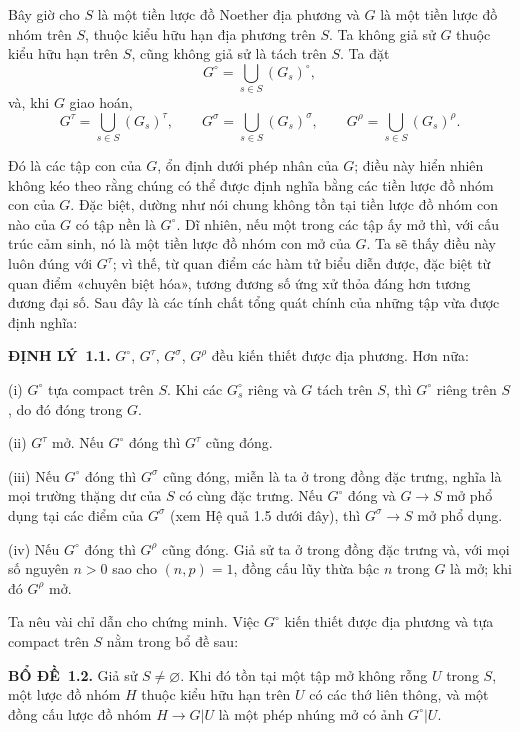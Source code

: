 \documentclass[11pt,twoside,openany]{book}
\numberwithin{equation}{section}
\newcommand{\src}[1]{%
  \phantomsection\hypertarget{src:\fgasourceid:#1}{}%
  \marginpar{\raggedleft\footnotesize\sffamily #1}%
}
\newcommand{\fgasourceid}{unset}
\newcommand{\result}[2]{\par\medskip\noindent\textbf{#1\if\relax\detokenize{#2}\relax\else\ #2\fi.}\quad}
\begin{document}
Bây giờ cho $S$ là một tiền lược đồ Noether địa phương và $G$ là một tiền
lược đồ nhóm trên $S$, thuộc kiểu hữu hạn địa phương trên $S$. Ta không giả
sử $G$ thuộc kiểu hữu hạn trên $S$, cũng không giả sử là tách trên $S$. Ta
đặt
\[
G^\circ=\bigcup_{s\in S}(G_s)^\circ,
\]
và, khi $G$ giao hoán,
\[
G^\tau=\bigcup_{s\in S}(G_s)^\tau,
\qquad
G^\sigma=\bigcup_{s\in S}(G_s)^\sigma,
\qquad
G^\rho=\bigcup_{s\in S}(G_s)^\rho.
\]
\src{224}
Đó là các tập con của $G$, ổn định dưới phép nhân của $G$; điều này hiển nhiên
không kéo theo rằng chúng có thể được định nghĩa bằng các tiền lược đồ nhóm
con của $G$. Đặc biệt, dường như nói chung không tồn tại tiền lược đồ nhóm
con nào của $G$ có tập nền là $G^\circ$. Dĩ nhiên, nếu một trong các tập ấy
mở thì, với cấu trúc cảm sinh, nó là một tiền lược đồ nhóm con mở của $G$. Ta
sẽ thấy điều này luôn đúng với $G^\tau$; vì thế, từ quan điểm các hàm tử biểu
diễn được, đặc biệt từ quan điểm «chuyên biệt hóa», tương đương số ứng xử thỏa
đáng hơn tương đương đại số. Sau đây là các tính chất tổng quát chính của
những tập vừa được định nghĩa:

\result{ĐỊNH LÝ}{1.1} $G^\circ$, $G^\tau$, $G^\sigma$, $G^\rho$ đều kiến
thiết được địa phương. Hơn nữa:

\noindent (i) $G^\circ$ tựa compact trên $S$. Khi các $G_s^\circ$ riêng và
$G$ tách trên $S$, thì $G^\circ$ riêng trên $S$, do đó đóng trong $G$.

\noindent (ii) $G^\tau$ mở. Nếu $G^\circ$ đóng thì $G^\tau$ cũng đóng.

\noindent (iii) Nếu $G^\circ$ đóng thì $G^\sigma$ cũng đóng, miễn là ta ở
trong đồng đặc trưng, nghĩa là mọi trường thặng dư của $S$ có cùng đặc trưng.
Nếu $G^\circ$ đóng và $G\longrightarrow S$ mở phổ dụng tại các điểm của
$G^\sigma$ (xem Hệ quả 1.5 dưới đây), thì
$G^\sigma\longrightarrow S$ mở phổ dụng.

\noindent (iv) Nếu $G^\circ$ đóng thì $G^\rho$ cũng đóng. Giả sử ta ở trong
đồng đặc trưng và, với mọi số nguyên $n>0$ sao cho $(n,p)=1$, đồng cấu lũy
thừa bậc $n$ trong $G$ là mở; khi đó $G^\rho$ mở.

Ta nêu vài chỉ dẫn cho chứng minh. Việc $G^\circ$ kiến thiết được địa phương
và tựa compact trên $S$ nằm trong bổ đề sau:

\result{BỔ ĐỀ}{1.2} Giả sử $S\neq\varnothing$. Khi đó tồn tại một tập mở
không rỗng $U$ trong $S$, một lược đồ nhóm $H$ thuộc kiểu hữu hạn trên $U$ có
các thớ liên thông, và một đồng cấu lược đồ nhóm
$H\longrightarrow G|U$ là một phép nhúng mở có ảnh $G^\circ|U$.
\end{document}
